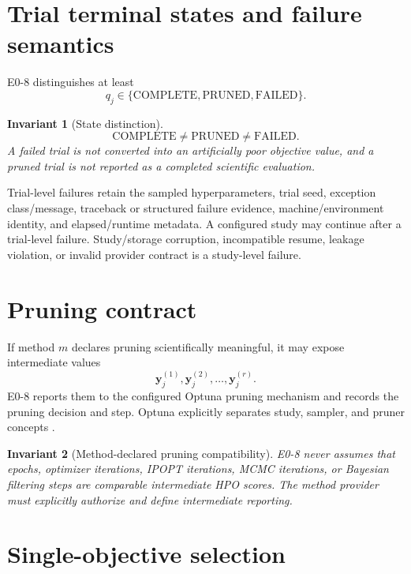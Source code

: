 \documentclass[11pt]{article}
\newtheorem{invariant}{Invariant}
\begin{document}
\section{Trial terminal states and failure semantics}

E0-8 distinguishes at least
\[
q_j\in\{\mathrm{COMPLETE},\mathrm{PRUNED},\mathrm{FAILED}\}.
\]

\begin{invariant}[State distinction]
\[
\boxed{
\mathrm{COMPLETE}\neq\mathrm{PRUNED}\neq\mathrm{FAILED}.
}
\]
A failed trial is not converted into an artificially poor objective value, and
a pruned trial is not reported as a completed scientific evaluation.
\end{invariant}

Trial-level failures retain the sampled hyperparameters, trial seed, exception
class/message, traceback or structured failure evidence, machine/environment
identity, and elapsed/runtime metadata. A configured study may continue after a
trial-level failure. Study/storage corruption, incompatible resume, leakage
violation, or invalid provider contract is a study-level failure.

\section{Pruning contract}

If method $m$ declares pruning scientifically meaningful, it may expose
intermediate values
\[
\mathbf y_j^{(1)},\mathbf y_j^{(2)},\ldots,\mathbf y_j^{(r)}.
\]
E0-8 reports them to the configured Optuna pruning mechanism and records the
pruning decision and step. Optuna explicitly separates study, sampler, and
pruner concepts \cite{OptunaDocs2026}.

\begin{invariant}[Method-declared pruning compatibility]
E0-8 never assumes that epochs, optimizer iterations, IPOPT iterations, MCMC
iterations, or Bayesian filtering steps are comparable intermediate HPO scores.
The method provider must explicitly authorize and define intermediate reporting.
\end{invariant}

\section{Single-objective selection}
\end{document}
